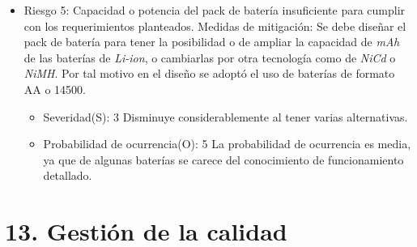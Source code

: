 \documentclass[11pt]{charter}
\begin{document}
\begin{itemize}
\begin{itemize}
	\end{itemize}
\item Riesgo 5: Capacidad o potencia del pack de batería	insuficiente para cumplir con los requerimientos planteados.
	Medidas de mitigación: Se debe diseñar el pack de batería para tener la posibilidad o de ampliar la capacidad de \textit{mAh} de las baterías de \textit{Li-ion}, o cambiarlas por otra tecnología como de \textit{NiCd} o \textit{NiMH}. Por tal motivo en el diseño se adoptó el uso de baterías de formato AA o 14500.
	\begin{itemize}
	\item Severidad(S): 3 Disminuye considerablemente al tener varias alternativas.
	\item  Probabilidad de ocurrencia(O): 5 La probabilidad de ocurrencia es media, ya que de algunas baterías se carece del conocimiento de funcionamiento detallado. 
	\end{itemize}
\end{itemize}




 



\section{13. Gestión de la calidad}
\label{sec:calidad}

\end{document}
